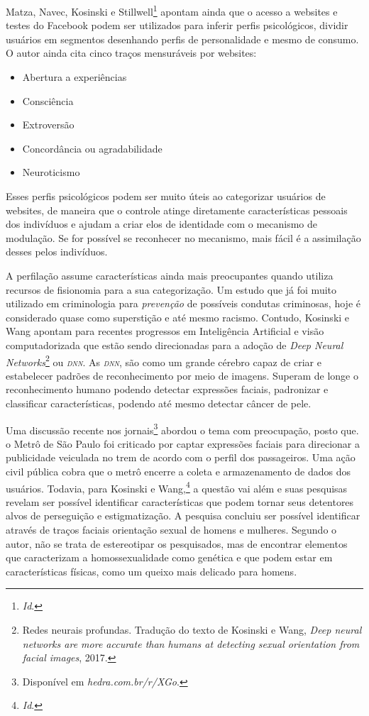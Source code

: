 Matza, Navec, Kosinski e Stillwell\footnote{\textit{Id}.} apontam ainda que o acesso a
websites e testes do Facebook podem ser utilizados para inferir perfis
psicológicos, dividir usuários em segmentos desenhando perfis de
personalidade e mesmo de consumo. O autor ainda cita cinco traços
mensuráveis por websites:

\begin{itemize}
\item
  Abertura a experiências
\item
  Consciência
\item
  Extroversão
\item
  Concordância ou agradabilidade
\item
  Neuroticismo
\end{itemize}

Esses perfis psicológicos podem ser muito úteis ao categorizar usuários
de websites, de maneira que o controle atinge diretamente
características pessoais dos indivíduos e ajudam a criar elos de
identidade com o mecanismo de modulação. Se for possível se reconhecer
no mecanismo, mais fácil é a assimilação desses pelos indivíduos.

A perfilação assume características ainda mais preocupantes quando
utiliza recursos de fisionomia para a sua categorização. Um estudo que
já foi muito utilizado em criminologia para \textit{prevenção} de possíveis
condutas criminosas, hoje é considerado quase como superstição e até
mesmo racismo. Contudo, Kosinski e Wang apontam para recentes
progressos em Inteligência Artificial e visão computadorizada que estão
sendo direcionadas para a adoção de \textit{Deep Neural
Networks}\footnote{Redes neurais profundas. Tradução do texto de
  Kosinski e Wang, \textit{Deep neural networks are more accurate than humans at detecting sexual orientation from facial images}, 2017.} ou \textit{\textsc{dnn}}. As \textit{\textsc{dnn}}, são como um
grande cérebro capaz de criar e estabelecer padrões de reconhecimento
por meio de imagens. Superam de longe o reconhecimento humano podendo
detectar expressões faciais, padronizar e classificar características,
podendo até mesmo detectar câncer de pele.

Uma discussão recente nos jornais\footnote{Disponível em \textit{hedra.com.br/r/XGo}.} abordou o tema com preocupação, posto que.
o Metrô de São Paulo foi criticado por captar expressões faciais para
direcionar a publicidade veiculada no trem de acordo com o perfil dos
passageiros. Uma ação civil pública cobra que o metrô encerre a coleta e
armazenamento de dados dos usuários. Todavia, para Kosinski e Wang,\footnote{\textit{Id}.}
a questão vai além e suas pesquisas revelam ser possível identificar
características que podem tornar seus detentores alvos de perseguição e
estigmatização. A pesquisa concluiu ser possível identificar através de
traços faciais orientação sexual de homens e mulheres. Segundo o autor,
não se trata de estereotipar os pesquisados, mas de encontrar elementos
que caracterizam a homossexualidade como genética e que podem estar em
características físicas, como um queixo mais delicado para homens.

